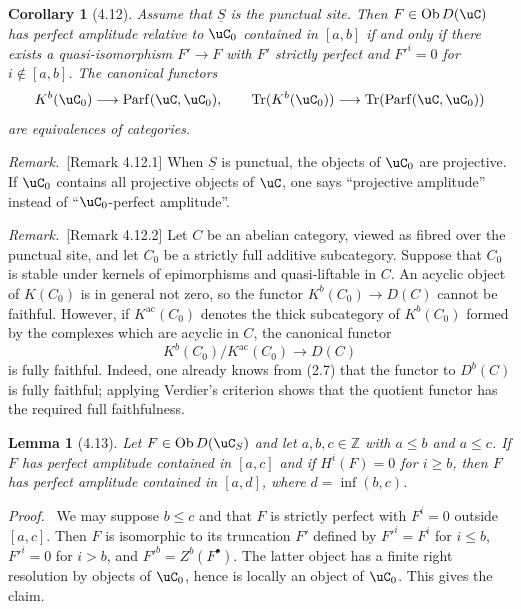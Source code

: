\documentclass[11pt]{article}
\theoremstyle{plain}
\newtheorem*{lemma*}{Lemma}
\newtheorem*{corollary*}{Corollary}
\theoremstyle{definition}
\theoremstyle{remark}
\newenvironment{prooftext}{\par\noindent\textit{Proof.}\ }{\par\medskip}
\newenvironment{remarktext}{\par\medskip\noindent\textit{Remark.}\ }{\par\medskip}
\newcommand{\ZZ}{\mathbb Z}
\DeclareMathOperator{\ob}{Ob}
\DeclareMathOperator{\Tr}{Tr}
\providecommand{\Parf}{\operatorname{Parf}}
\providecommand{\uS}{\underline{S}}
\begin{document}
\begin{corollary*}[4.12]
Assume that $\uS$ is the punctual site. Then $F\in\ob D(\uC)$ has perfect amplitude relative to $\uC_0$ contained in $[a,b]$ if and only if there exists a quasi-isomorphism $F'\to F$ with $F'$ strictly perfect and $F'^i=0$ for $i\notin[a,b]$. The canonical functors
\[
K^b(\uC_0)\longrightarrow\Parf(\uC,\uC_0),
\qquad
\Tr(K^b(\uC_0))\longrightarrow\Tr(\Parf(\uC,\uC_0))
\]
are equivalences of categories.
\end{corollary*}

\begin{remarktext}[Remark 4.12.1]
When $\uS$ is punctual, the objects of $\uC_0$ are projective. If $\uC_0$ contains all projective objects of $\uC$, one says ``projective amplitude'' instead of ``$\uC_0$-perfect amplitude''.
\end{remarktext}

\begin{remarktext}[Remark 4.12.2]
Let $C$ be an abelian category, viewed as fibred over the punctual site, and let $C_0$ be a strictly full additive subcategory. Suppose that $C_0$ is stable under kernels of epimorphisms and quasi-liftable in $C$. An acyclic object of $K(C_0)$ is in general not zero, so the functor $K^b(C_0)\to D(C)$ cannot be faithful. However, if $K^{\mathrm{ac}}(C_0)$ denotes the thick subcategory of $K^b(C_0)$ formed by the complexes which are acyclic in $C$, the canonical functor
\[
K^b(C_0)/K^{\mathrm{ac}}(C_0)\longrightarrow D(C)
\]
is fully faithful. Indeed, one already knows from (2.7) that the functor to $D^b(C)$ is fully faithful; applying Verdier's criterion shows that the quotient functor has the required full faithfulness.
\end{remarktext}

\begin{lemma*}[4.13]
Let $F\in\ob D(\uC_S)$ and let $a,b,c\in\ZZ$ with $a\leq b$ and $a\leq c$. If $F$ has perfect amplitude contained in $[a,c]$ and if $H^i(F)=0$ for $i\geq b$, then $F$ has perfect amplitude contained in $[a,d]$, where $d=\inf(b,c)$.
\end{lemma*}

\begin{prooftext}
We may suppose $b\leq c$ and that $F$ is strictly perfect with $F^i=0$ outside $[a,c]$. Then $F$ is isomorphic to its truncation $F'$ defined by $F'^i=F^i$ for $i\leq b$, $F'^i=0$ for $i>b$, and $F'^b=Z^b(F^\bullet)$. The latter object has a finite right resolution by objects of $\uC_0$, hence is locally an object of $\uC_0$. This gives the claim.
\end{prooftext}
\end{document}
